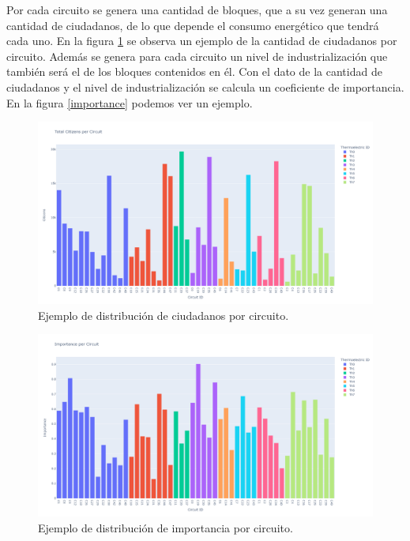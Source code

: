 \documentclass[twocolumn, fontsize=10pt]{article}
\begin{document}
Por cada circuito se genera una cantidad de bloques, que a su vez generan una cantidad de ciudadanos, de lo que depende 
el consumo energético que tendrá cada uno. En la figura \ref{fig:citizens} se observa un ejemplo de la cantidad de ciudadanos por circuito.
Además se genera para cada circuito un nivel de industrialización que también será el de los bloques contenidos en él.
Con el dato de la cantidad de ciudadanos y el nivel de industrialización se calcula un coeficiente de importancia. En la figura \ref{importance} podemos ver un ejemplo.\\

\begin{figure}[H]
  \centering
  \includegraphics[width=\columnwidth]{assets/citizenPercircuit.png}
  \caption{Ejemplo de distribución de ciudadanos por circuito.}
  \label{fig:citizens}
  \end{figure}

\begin{figure}[H]
  \centering
  \includegraphics[width=\columnwidth]{assets/importancePerCircuit.png}
  \caption{Ejemplo de distribución de importancia por circuito.}
  \label{fig:importance}
  \end{figure}
\end{document}
